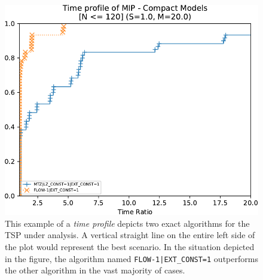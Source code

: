 \begin{figure}[t]
	\centering
	\includegraphics[width=\textwidth]{./Imgs/perfprof-tsp-example/time-ratio20.0.cropped.pdf}
	\caption{
		This example of a \textit{time profile} depicts two exact algorithms for the TSP under analysis.
		A vertical straight line on the entire left side of the plot would represent the best scenario.
		In the situation depicted in the figure, the algorithm named \texttt{FLOW-1|EXT\_CONST=1} outperforms the other algorithm in the vast majority of cases.
	}
	\label{fig:example-of-time-profile-tsp}
\end{figure}

